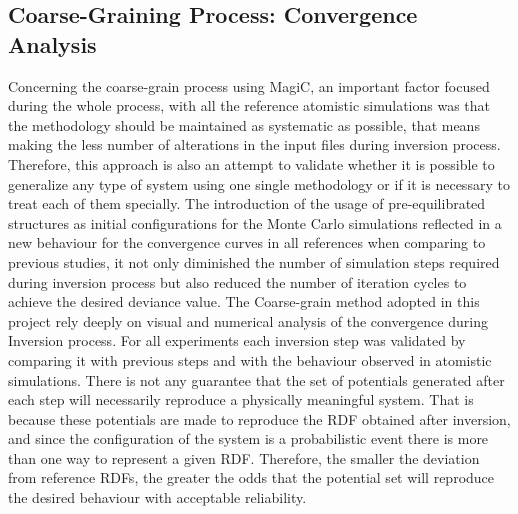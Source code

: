 \documentclass[10pt,a4paper,twoside]{article}
\begin{document}
\subsection{Coarse-Graining Process: Convergence Analysis}
 \label{sec:expMagic}
Concerning the coarse-grain process using MagiC, an important factor focused during the whole process, with all the reference atomistic simulations was that the methodology should be maintained as systematic as possible, that means making the less number of alterations in the input files during inversion process. Therefore, this approach is also an attempt to validate whether it is possible to generalize any type of system using one single methodology or if it is necessary to treat each of them specially. The introduction of the usage of pre-equilibrated structures as initial configurations for the Monte Carlo simulations reflected in a new behaviour for  the convergence curves in all references when comparing to previous studies, it not only diminished the number of simulation steps required during  inversion process but also reduced the number of iteration cycles to achieve the desired deviance value.
The Coarse-grain method adopted in this project rely deeply on visual and numerical analysis of the convergence during Inversion process. For all experiments each inversion step was validated by comparing it with previous steps and with the behaviour observed in atomistic simulations. There is not any guarantee that the set of potentials generated after each step will necessarily reproduce a physically meaningful system.  That is because these potentials are made to reproduce the RDF obtained after inversion, and since the configuration of the system is a probabilistic event there is more than one way to represent a given RDF. Therefore, the smaller the deviation from reference RDFs, the greater the odds that the potential set will reproduce the desired behaviour with acceptable reliability. 
\end{document}
